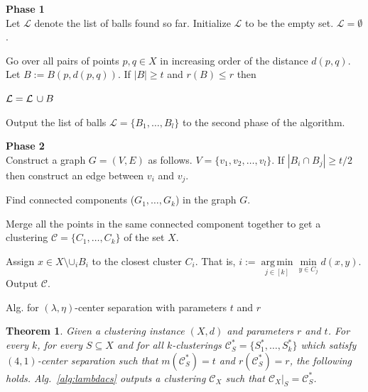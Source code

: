 \documentclass[12pt]{article}
\newtheorem{theorem}{Theorem}
\newcommand{\mc}{\mathcal}
\DeclareMathOperator*{\argmin}{arg\,min}
\begin{document}
\begin{algorithm}[!ht]	
	\Indp{}
	\KwOut{A clustering $\mc C$ of the set $X$.}
	
	\vspace{0.1in}\textbf{Phase 1}\\
	Let $\mc L$ denote the list of balls found so far. Initialize $\mc L$ to be the empty set. $\mc L = \emptyset$.
	
	Go over all pairs of points $p, q \in X$ in increasing order of the distance $d(p, q)$. Let $B := B(p, d(p, q))$. If $|B| \ge t$ and $r(B) \le r$ then
	
	\hspace{0.24in}$\mc L = \mc L \thinspace\cup B$
	
	\vspace{0.1in}Output the list of balls $\mc L = \{B_1, \ldots, B_l\}$ to the second phase of the algorithm.
	
	\vspace{0.1in}\textbf{Phase 2}\\
	Construct a graph $G = (V, E)$ as follows. $V = \{v_1, v_2, \ldots, v_l\}$. If $|B_i \cap B_j| \ge t/2$ then construct an edge between $v_i$ and $v_j$.
	
	Find connected components ($G_1, \ldots, G_{k}$) in the graph $G$. 
	
	Merge all the points in the same connected component together to get a clustering $\mc C = \{C_1, \ldots, C_k\}$ of the set $X$.
	
	Assign $x \in X \setminus \mc \cup_i B_i$ to the closest cluster $C_i$. That is, $i := \argmin\limits_{j\in [k]} \min\limits_{y \in C_j}d(x, y)$. Output $\mc C$. 
\caption{Alg. for $(\lambda, \eta)$-center separation with parameters $t$ and $r$}
\label{alg:lambdacs}
\end{algorithm}
\vspace{-.1in}
\begin{theorem}
\label{thm:lambdacsnoise}
Given a clustering instance $(X, d)$ and parameters $r$ and $t$. For every $k$, for every $S \subseteq X$ and for all $k$-clusterings $\mc C^*_{S} = \{S_1^*, \ldots, S_k^*\}$ which satisfy $(4, 1)$-center separation such that $ m(\mc C_{S}^*) = t$ and $r(\mc C_{S}^*) = r$, the following holds. Alg.~\ref{alg:lambdacs} outputs a clustering $\mc C_{X}$ such that $\mc C_{X}|_{S} = \mc C_{S}^*$.
\end{theorem}
\end{document}
